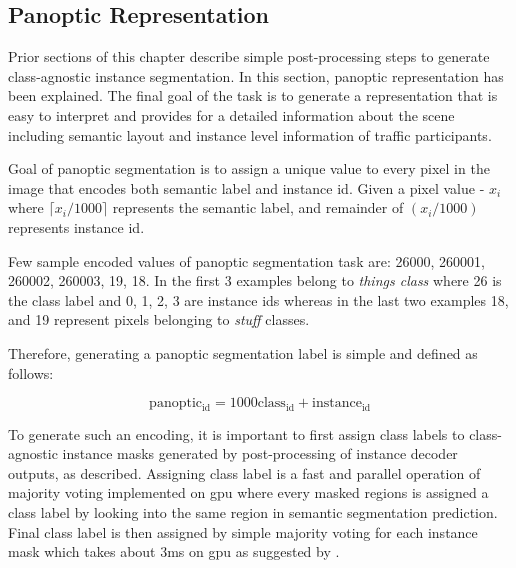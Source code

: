 \subsection{Panoptic Representation}


Prior sections of this chapter describe simple post-processing steps to generate class-agnostic instance segmentation. In this section, panoptic representation has been explained. The final goal of the task is to generate a representation that is easy to interpret and provides for a detailed information about the scene including semantic layout and instance level information of traffic participants. 

Goal of panoptic segmentation is to assign a unique value to every pixel in the image that encodes both semantic label and instance id.  Given a pixel value - $x_i$ where $\lceil x_i / 1000\rceil$  represents the semantic label, and remainder of $( x_i / 1000 )$ represents instance id.

Few sample encoded values of panoptic segmentation task are: 26000, 260001, 260002, 260003, 19, 18. In the first 3 examples belong to \textit{things class} where 26 is the class label and 0, 1, 2, 3 are instance ids whereas in the last two examples 18, and 19 represent pixels belonging to \textit{stuff} classes.

Therefore, generating a panoptic segmentation label is simple and defined as follows:

\begin{equation}
\mathrm{panoptic_{id}} = \mathrm{1000 class_{id}} + \mathrm{instance_{id}}
\label{eq:outeredgemodel}
\end{equation}


To generate such an encoding, it is important to first assign class labels to class-agnostic instance masks generated by post-processing of instance decoder outputs, as described. Assigning class label is a fast and parallel operation of majority voting implemented on \gls{gpu} where every masked regions is assigned a class label by looking into the same region in semantic segmentation prediction. Final class label is then assigned by simple majority voting for each instance mask which takes about 3ms on \gls{gpu} as suggested by \cite{Cheng_2020_CVPR}.




